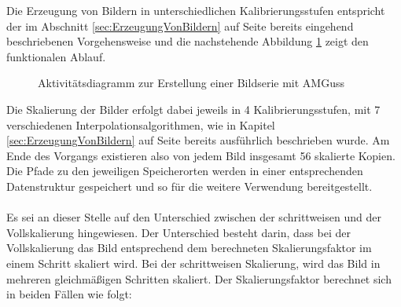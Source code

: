 \documentclass[
fontsize=10pt, 
listof = totoc,
parskip = half	
]{report}
\begin{document}
Die Erzeugung von Bildern in unterschiedlichen Kalibrierungsstufen entspricht der im Abschnitt \ref{sec:ErzeugungVonBildern} auf Seite \pageref{sec:ErzeugungVonBildern} bereits eingehend beschriebenen Vorgehensweise und die nachstehende Abbildung \ref{fig:Bildskalierung} zeigt den funktionalen Ablauf.

\begin{figure}[H]
	\centering
	\caption{Aktivitätsdiagramm zur Erstellung einer Bildserie mit AMGuss}
	\label{fig:Bildskalierung}
\end{figure}

\noindent Die Skalierung der Bilder erfolgt dabei jeweils in 4 Kalibrierungsstufen, mit 7 verschiedenen Interpolationsalgorithmen, wie in Kapitel \ref{sec:ErzeugungVonBildern} auf Seite \pageref{sec:ErzeugungVonBildern} bereits ausführlich beschrieben wurde. Am Ende des Vorgangs existieren also von jedem Bild insgesamt 56 skalierte Kopien. Die Pfade zu den jeweiligen Speicherorten werden in einer entsprechenden Datenstruktur gespeichert und so für die weitere Verwendung bereitgestellt.
\\\\
Es sei an dieser Stelle auf den Unterschied zwischen der schrittweisen und der Vollskalierung hingewiesen. Der Unterschied besteht darin, dass bei der Vollskalierung das Bild entsprechend dem berechneten Skalierungsfaktor im  einem Schritt skaliert wird. Bei der schrittweisen Skalierung, wird das Bild in mehreren gleichmäßigen Schritten skaliert. Der Skalierungsfaktor berechnet sich in beiden Fällen wie folgt:
\end{document}

